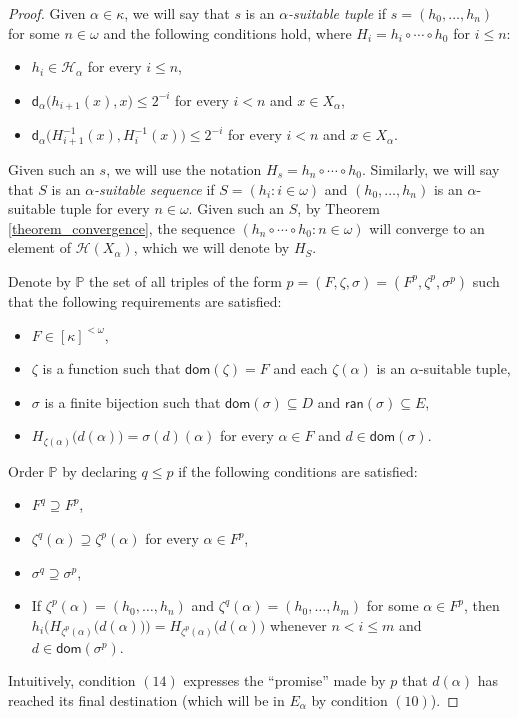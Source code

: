 \documentclass{amsart}
\theoremstyle{plain}
\theoremstyle{definition}
\newcommand{\dom}{\mathsf{dom}}
\newcommand{\ran}{\mathsf{ran}}
\newcommand{\di}{\mathsf{d}}
\newcommand{\HH}{\mathcal{H}}
\newcommand{\PPP}{\mathbb{P}}
\begin{document}
\begin{proof}
Given $\alpha\in\kappa$, we will say that $s$ is an \emph{$\alpha$-suitable tuple} if $s=(h_0,\ldots, h_n)$ for some $n\in\omega$ and the following conditions hold, where $H_i=h_i\circ\cdots\circ h_0$ for $i\leq n$:
\begin{itemize}
\item[(4)] $h_i\in\HH_\alpha$ for every $i\leq n$,
\item[(5)] $\di_\alpha\big(h_{i+1}(x),x\big)\leq 2^{-i}$ for every $i<n$ and $x\in X_\alpha$,
\item[(6)] $\di_\alpha\big(H_{i+1}^{-1}(x),H_i^{-1}(x)\big)\leq 2^{-i}$ for every $i<n$ and $x\in X_\alpha$.
\end{itemize}
Given such an $s$, we will use the notation $H_s=h_n\circ\cdots\circ h_0$. Similarly, we will say that $S$ is an \emph{$\alpha$-suitable sequence} if $S=(h_i:i\in\omega)$ and $(h_0,\ldots, h_n)$ is an $\alpha$-suitable tuple for every $n\in\omega$. Given such an $S$, by Theorem \ref{theorem_convergence}, the sequence $(h_n\circ\cdots\circ h_0:n\in\omega)$ will converge to an element of $\HH(X_\alpha)$, which we will denote by $H_S$.

Denote by $\PPP$ the set of all triples of the form $p=(F,\zeta,\sigma)=(F^p,\zeta^p,\sigma^p)$ such that the following requirements are satisfied:
\begin{itemize}
\item[(7)] $F\in [\kappa]^{<\omega}$,
\item[(8)] $\zeta$ is a function such that $\dom(\zeta)=F$ and each $\zeta(\alpha)$ is an $\alpha$-suitable tuple,
\item[(9)] $\sigma$ is a finite bijection such that $\dom(\sigma)\subseteq D$ and $\ran(\sigma)\subseteq E$,
\item[(10)] $H_{\zeta(\alpha)}\big(d(\alpha)\big)=\sigma(d)(\alpha)$ for every $\alpha\in F$ and $d\in\dom(\sigma)$.
\end{itemize}
Order $\PPP$ by declaring $q\leq p$ if the following conditions are satisfied:
\begin{itemize}
\item[(11)] $F^q\supseteq F^p$,
\item[(12)] $\zeta^q(\alpha)\supseteq\zeta^p(\alpha)$ for every $\alpha\in F^p$,
\item[(13)] $\sigma^q\supseteq\sigma^p$,
\item[(14)] If $\zeta^p(\alpha)=(h_0,\ldots,h_n)$ and $\zeta^q(\alpha)=(h_0,\ldots,h_m)$ for some $\alpha\in F^p$, then $h_i\Big(H_{\zeta^p(\alpha)}\big(d(\alpha)\big)\Big)=H_{\zeta^p(\alpha)}\big(d(\alpha)\big)$ whenever $n<i\leq m$ and $d\in\dom(\sigma^p)$.
\end{itemize}
Intuitively, condition $(14)$ expresses the ``promise'' made by $p$ that $d(\alpha)$ has reached its final destination (which will be in $E_\alpha$ by condition $(10)$).


\end{proof}
\end{document}
